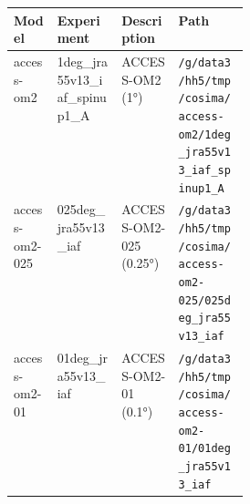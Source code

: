 
\begin{tabularx}{\linewidth}{lXXp{0.3\linewidth}}
\hline
\textbf{Model} & \textbf{Experiment} & \textbf{Description} & \textbf{Path} \\
\hline

access-om2 & 1deg_jra55v13_iaf_spinup1_A & ACCESS-OM2 (1°) & \texttt{\slash g\slash data3\slash hh5\slash tmp\slash cosima\slash access-om2\slash 1deg_jra55v13_iaf_spinup1_A}\\
access-om2-025 & 025deg_jra55v13_iaf & ACCESS-OM2-025 (0.25°) & \texttt{\slash g\slash data3\slash hh5\slash tmp\slash cosima\slash access-om2-025\slash 025deg_jra55v13_iaf}\\
access-om2-01 & 01deg_jra55v13_iaf & ACCESS-OM2-01 (0.1°) & \texttt{\slash g\slash data3\slash hh5\slash tmp\slash cosima\slash access-om2-01\slash 01deg_jra55v13_iaf}\\

\hline
\hline
\end{tabularx}
